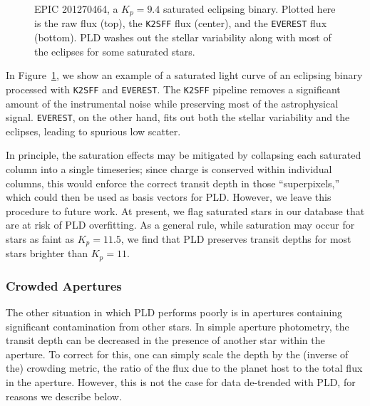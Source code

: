 \documentclass[]{emulateapj}
\begin{document}
\begin{figure}[h]
  \begin{center}
       \caption{EPIC 201270464, a $K_p = 9.4$ saturated eclipsing binary. Plotted here
                is the raw flux (top), the \texttt{K2SFF} flux (center), and the \texttt{EVEREST}
                flux (bottom). PLD washes out the stellar variability along with most of the eclipses
                for some saturated stars.}
     \label{fig:201270464}
  \end{center}
\end{figure}

In Figure~\ref{fig:201270464}, we show an example of a saturated light curve of an eclipsing
binary processed with \texttt{K2SFF} and \texttt{EVEREST}. The \texttt{K2SFF} pipeline removes
a significant amount of the instrumental noise while preserving most of the astrophysical signal.
\texttt{EVEREST}, on the other hand, fits out both the stellar variability and the eclipses,
leading to spurious low scatter.

In principle, the saturation effects may be mitigated by collapsing each saturated column
into a single timeseries; since charge is conserved within individual columns, this would enforce
the correct transit depth in those ``superpixels,'' which could then be used as basis
vectors for PLD. However, we leave this procedure to future work. At present, we flag
saturated stars in our database that are at risk of PLD overfitting. As a general rule, 
while saturation may occur for stars as faint as $K_p = 11.5$, we find that PLD preserves transit
depths for most stars brighter than $K_p = 11$.

\subsubsection{Crowded Apertures}
\label{sec:crowded}
The other situation in which PLD performs poorly is in apertures containing significant
contamination from other stars. In simple aperture photometry, the transit depth
can be decreased in the presence of another star within the aperture. To correct for 
this, one can simply scale the depth by the (inverse of the) crowding metric, the ratio of 
the flux due to the planet host to the total flux in the aperture. However, this is not
the case for data de-trended with PLD, for reasons we describe below.
\end{document}
